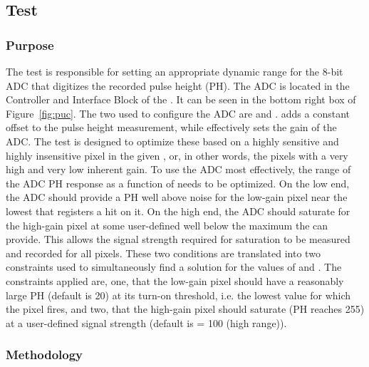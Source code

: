 
\newpage

\subsection{\phopt Test}
\label{ss:phoptimization}

\subsubsection{Purpose}

The \phopt test is responsible for setting an appropriate dynamic range for the 8-bit ADC that digitizes the recorded pulse height (PH).
The ADC is located in the Controller and Interface Block of the \roc.
It can be seen in the bottom right box of Figure~\ref{fig:puc}.
The two \dacs used to configure the ADC are \phoffset and \phscale.
\phoffset adds a constant offset to the pulse height measurement,
while \phscale effectively sets the gain of the ADC.
The \phopt test is designed to optimize these \dacs based on a highly sensitive and highly insensitive pixel in the given \roc, 
or, in other words, the pixels with a very high and very low inherent gain.
To use the ADC most effectively, the range of the ADC PH response as a function of \vcal needs to be optimized.
On the low end, the ADC should provide a PH well above noise for the low-gain pixel near the lowest \vcal that registers a hit on it.
On the high end, the ADC should saturate for the high-gain pixel at some user-defined \vcal well below the maximum \vcal the \roc can provide.
This allows the signal strength required for saturation to be measured and recorded for all pixels.
These two conditions are translated into two constraints used to simultaneously find a solution for the values of \phoffset and \phscale.
The constraints applied are, one, that the low-gain pixel should have a reasonably large PH (default is 20) at its \vcal turn-on threshold,
i.e. the lowest \vcal value for which the pixel fires, 
and two, that the high-gain pixel should saturate (PH reaches 255) at a user-defined signal strength (default is \vcal = 100 (high range)).

\subsubsection{Methodology}

